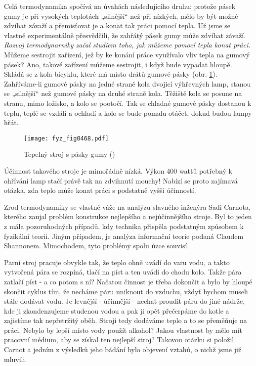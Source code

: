     Celá termodynamika spočívá na úvahách následujícího druhu: protože pásek gumy je při vysokých
    teplotách „silnější“ než při nízkých, mělo by být možné zdvíhat závaží a přemisťovat je a konat
    tak práci pomocí tepla. Už jsme se vlastně experimentálně přesvědčili, že zahřátý pásek gumy
    může zdvíhat závaží. \emph{Rozvoj termodynarniky začal studiem toho, jak můžeme pomocí tepla
    konat práci.} Můžeme sestrojit zařízení, jež by ke konání práce využívalo vliv tepla na gumový
    pásek? Ano, takové zařízení můžeme sestrojit, i když bude vypadat hloupě. Skládá se z kola
    bicyklu, které má místo drátů gumové pásky (obr. \ref{fyz:fig0468}). Zahříváme-li gumové pásky na
    jedné straně kola dvojicí výhřevných lamp, stanou se „silnější“ než gumové pásky na druhé straně
    kola. Těžiště kola se posune na stranu, mimo ložisko, a kolo se pootočí. Tak se chladné gumové
    pásky dostanou k teplu, teplé se vzdálí a ochladí a kolo se bude pomalu otáčet, dokud budou
    lampy hřát.

    \begin{figure}[ht!] %
      \centering
      \texttt{[image: fyz\_fig0468.pdf]}
      \caption{ Tepelný stroj s pásky gumy (\cite[s.~707]{Feynman01})}
      \label{fyz:fig0468}
    \end{figure}

    Účinnost takového stroje je mimořádně nízká. Výkon 400 wattů potřebný k ohřívání lamp stačí
    právě tak na zdvihnutí mouchy! Nabízí se proto zajímavá otázka, zda teplo může konat práci s
    podstatně vyšší účinností.

    Zrod termodynamiky se vlastně váže na analýzu slavného inženýra Sadi Carnota, kterého zaujal
    problém konstrukce nejlepšího a nejúčinnějšího stroje. Byl to jeden z mála pozoruhodných
    případů, kdy technika přispěla podstatným způsobem k fyzikální teorii. Jiným případem, je
    analýza informační teorie podaná Claudem Shannonem. Mimochodem, tyto problémy spolu úzce
    souvisí.

    Parní stroj pracuje obvykle tak, že teplo ohně uvádí do varu vodu, a takto vytvořená pára se
    rozpíná, tlačí na píst a ten uvádí do chodu kolo. Takže pára zatlačí píst - a co potom s ní?
    Načatou činnost je třeba dokončit a bylo by hloupé skončit cyklus tím, že necháme páru
    uniknout do vzduchu, vždyť bychom museli stále dodávat vodu. Je levnější - účinnější - nechat
    proudit páru do jiné nádrže, kde ji zkondenzujeme studenou vodou a pak ji opět přečerpáme
    do kotle a zajistíme tak nepřetržitý oběh. Stroji tedy dodáváme teplo a to se přeměňuje na práci.
    Nebylo by lepší místo vody použít alkohol? Jakou vlastnost by mělo mít pracovní médium, aby
    se získal ten nejlepší stroj? Takovou otázku si položil Carnot a jedním z výsledků jeho bádání
    bylo objevení vztahů, o nichž jsme již mluvili.

